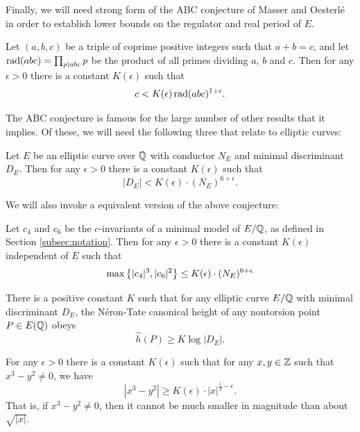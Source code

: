 Finally, we will need strong form of the ABC conjecture of Masser and Oesterl\'{e} in order to establish lower bounds on the regulator and real period of $E$.
\begin{conjecture} \label{conj:ABC}
Let $(a,b,c)$ be a triple of coprime positive integers such that $a+b = c$, and let $\operatorname{rad}(abc) = \prod_{p | abc} p$ be the product of all primes dividing $a$, $b$ and $c$. Then for any $\epsilon > 0$ there is a constant $K(\epsilon)$ such that
\begin{equation}
c < K(\epsilon)\operatorname{rad}(abc)^{1+\epsilon}.
\end{equation}
\end{conjecture}
The ABC conjecture is famous for the large number of other results that it implies. Of these, we will need the following three that relate to elliptic curves:

\begin{conjecture}[Szpiro]\label{conj:Szpiro}
Let $E$ be an elliptic curve over $\mathbb{Q}$ with conductor $N_E$ and minimal discriminant $D_E$. Then for any $\epsilon > 0$ there is a constant $K(\epsilon)$ such that
\begin{equation}
|D_E| < K(\epsilon)\cdot (N_E)^{6+\epsilon}.
\end{equation}
\end{conjecture}

We will also invoke a equivalent version of the above conjecture:
\begin{conjecture}\label{conj:modified_szpiro}
Let $c_4$ and $c_6$ be the $c$-invariants of a minimal model of $E/\mathbb{Q}$, as defined in Section \ref{subsec:notation}. Then for any $\epsilon>0$ there is a constant $K(\epsilon)$ independent of $E$ such that
\begin{equation}
\max\left\{|c_4|^3,|c_6|^2\right\} \le K(\epsilon)\cdot (N_E)^{6+\epsilon}
\end{equation}
\end{conjecture}

\begin{conjecture}[Lang]\label{conj:Lang}
There is a positive constant $K$ such that for any elliptic curve $E/\mathbb{Q}$ with minimal discriminant $D_E$, the N\'{e}ron-Tate canonical height of any nontorsion point $P\in E(\mathbb{Q})$ obeys
\begin{equation}
\hat{h}(P) \ge K\log |D_E|.
\end{equation}
\end{conjecture}

\begin{conjecture}[Hall]\label{conj:Hall}
For any $\epsilon > 0$ there is a constant $K(\epsilon)$ such that for any $x,y \in \mathbb{Z}$ such that $x^3-y^2 \ne 0$, we have
\begin{equation}
|x^3-y^2| \ge K(\epsilon)\cdot |x|^{\frac{1}{2}-\epsilon}.
\end{equation}
That is, if $x^3-y^2 \ne 0$, then it cannot be much smaller in magnitude than about $\sqrt{|x|}$.
\end{conjecture}

